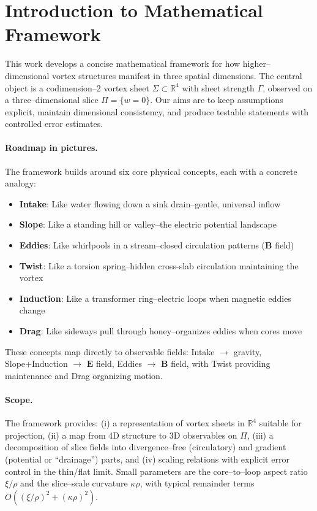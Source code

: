 \section{Introduction to Mathematical Framework}

This work develops a concise mathematical framework for how higher–dimensional vortex structures manifest in three spatial dimensions. The central object is a codimension–2 vortex sheet $\Sigma\subset\mathbb{R}^4$ with sheet strength $\Gamma$, observed on a three–dimensional slice $\Pi=\{w=0\}$. Our aims are to keep assumptions explicit, maintain dimensional consistency, and produce testable statements with controlled error estimates.

\paragraph{Roadmap in pictures.}
The framework builds around six core physical concepts, each with a concrete analogy:
\begin{itemize}
  \item \textbf{Intake}: Like water flowing down a sink drain--gentle, universal inflow
  \item \textbf{Slope}: Like a standing hill or valley--the electric potential landscape
  \item \textbf{Eddies}: Like whirlpools in a stream--closed circulation patterns ($\mathbf{B}$ field)
  \item \textbf{Twist}: Like a torsion spring--hidden cross-slab circulation maintaining the vortex
  \item \textbf{Induction}: Like a transformer ring--electric loops when magnetic eddies change
  \item \textbf{Drag}: Like sideways pull through honey--organizes eddies when cores move
\end{itemize}
These concepts map directly to observable fields: Intake $\to$ gravity, Slope+Induction $\to$ $\mathbf{E}$ field, Eddies $\to$ $\mathbf{B}$ field, with Twist providing maintenance and Drag organizing motion.

\paragraph{Scope.}
The framework provides:
(i) a representation of vortex sheets in $\mathbb{R}^4$ suitable for projection,
(ii) a map from 4D structure to 3D observables on $\Pi$,
(iii) a decomposition of slice fields into divergence–free (circulatory) and gradient (potential or ``drainage'') parts, and
(iv) scaling relations with explicit error control in the thin/flat limit.
Small parameters are the core–to–loop aspect ratio $\xi/\rho$ and the slice–scale curvature $\kappa\rho$, with typical remainder terms $O\!\left((\xi/\rho)^2+(\kappa\rho)^2\right)$.

